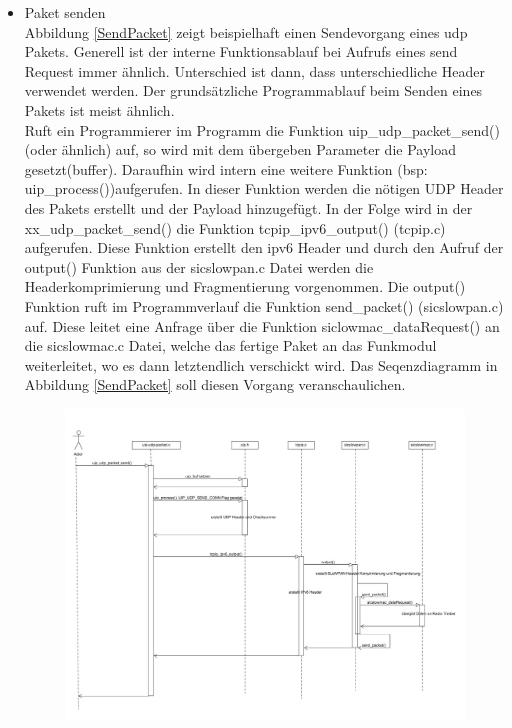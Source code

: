 	
	\begin{itemize}
		\item Paket senden\\
		Abbildung \ref{SendPacket} zeigt beispielhaft einen Sendevorgang eines \ac{udp} Pakets. Generell ist der interne Funktionsablauf bei Aufrufs eines send Request immer ähnlich. Unterschied ist dann, dass unterschiedliche Header verwendet werden. Der grundsätzliche Programmablauf beim Senden eines Pakets ist meist ähnlich.\\
		Ruft ein Programmierer im Programm die Funktion uip\_udp\_packet\_send() (oder ähnlich) auf, so wird mit dem übergeben Parameter die Payload gesetzt(buffer). Daraufhin wird intern eine weitere Funktion (bsp: uip\_process())aufgerufen. In dieser Funktion werden die nötigen UDP Header des Pakets erstellt und der Payload hinzugefügt. In der Folge wird in der xx\_udp\_packet\_send() die Funktion tcpip\_ipv6\_output() (tcpip.c) aufgerufen. Diese Funktion erstellt den \ac{ipv6} Header und durch den Aufruf der output() Funktion aus der sicslowpan.c Datei werden die Headerkomprimierung und Fragmentierung vorgenommen. Die output() Funktion ruft im Programmverlauf die Funktion send\_packet() (sicslowpan.c) auf. Diese leitet eine Anfrage über die Funktion siclowmac\_dataRequest() an die sicslowmac.c Datei, welche das fertige Paket an das Funkmodul weiterleitet, wo es dann letztendlich verschickt wird. Das Seqenzdiagramm in Abbildung \ref{SendPacket} soll diesen Vorgang veranschaulichen.
		\begin{figure}
			\centering
			\includegraphics[scale=0.33]{Grafiken-Julian/SendPacket.jpg}

\end{figure}
\end{itemize}
